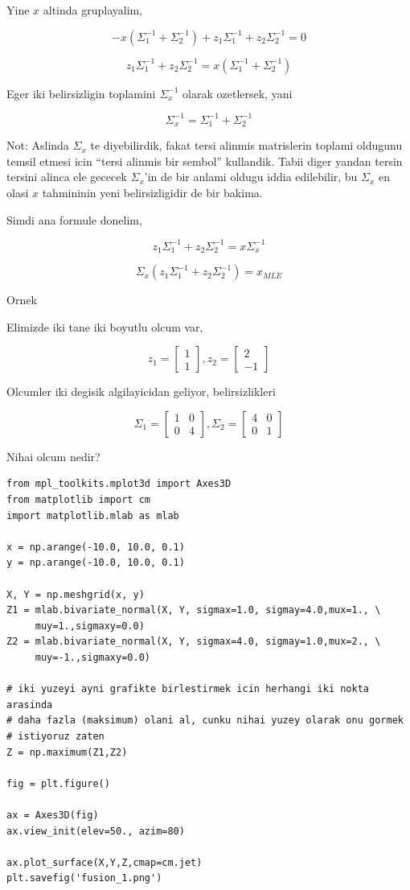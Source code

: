 \documentclass[12pt,fleqn]{article}\usepackage{../common}
\begin{document}
Yine $x$ altinda gruplayalim,

$$ 
-x(\Sigma_1^{-1} + \Sigma_2^{-1}) + z_1\Sigma_1^{-1}  + z_2\Sigma_2^{-1}  = 0
$$

$$ 
z_1\Sigma_1^{-1}  + z_2\Sigma_2^{-1}  = x(\Sigma_1^{-1} + \Sigma_2^{-1}) 
$$

Eger iki belirsizligin toplamini $\Sigma_x^{-1}$ olarak ozetlersek, yani 

$$ 
\Sigma_x^{-1} = \Sigma_1^{-1} + \Sigma_2^{-1}
$$

Not: Aslinda $\Sigma_x$ te diyebilirdik, fakat tersi alinmis matrislerin
toplami oldugunu temsil etmesi icin ``tersi alinmis bir sembol''
kullandik. Tabii diger yandan tersin tersini alinca ele gececek
$\Sigma_x$'in de bir anlami oldugu iddia edilebilir, bu $\Sigma_x$ en olasi
$x$ tahmininin yeni belirsizligidir de bir bakima. 

Simdi ana formule donelim,

$$ 
z_1\Sigma_1^{-1}  + z_2\Sigma_2^{-1}  = x\Sigma_x^{-1}
$$


$$ 
\Sigma_x (z_1\Sigma_1^{-1}  + z_2\Sigma_2^{-1}) = x_{MLE}
$$

Ornek

Elimizde iki tane iki boyutlu olcum var, 

$$ z_1 = \left[\begin{array}{c}
1 \\ 1
\end{array}\right], 
z_2 = \left[\begin{array}{r}
2 \\ -1
\end{array}\right] 
$$

Olcumler iki degisik algilayicidan geliyor, belirsizlikleri

$$ 
\Sigma_1 = 
\left[\begin{array}{cc}
1 & 0 \\ 0 & 4
\end{array}\right], 
\Sigma_2 = 
\left[\begin{array}{cc}
4 & 0 \\ 0 & 1
\end{array}\right]
 $$

Nihai olcum nedir? 

\begin{verbatim}
from mpl_toolkits.mplot3d import Axes3D
from matplotlib import cm
import matplotlib.mlab as mlab

x = np.arange(-10.0, 10.0, 0.1)
y = np.arange(-10.0, 10.0, 0.1)

X, Y = np.meshgrid(x, y)
Z1 = mlab.bivariate_normal(X, Y, sigmax=1.0, sigmay=4.0,mux=1., \
     muy=1.,sigmaxy=0.0)
Z2 = mlab.bivariate_normal(X, Y, sigmax=4.0, sigmay=1.0,mux=2., \
     muy=-1.,sigmaxy=0.0)

# iki yuzeyi ayni grafikte birlestirmek icin herhangi iki nokta arasinda
# daha fazla (maksimum) olani al, cunku nihai yuzey olarak onu gormek 
# istiyoruz zaten
Z = np.maximum(Z1,Z2)

fig = plt.figure()

ax = Axes3D(fig)
ax.view_init(elev=50., azim=80)

ax.plot_surface(X,Y,Z,cmap=cm.jet)
plt.savefig('fusion_1.png')
\end{verbatim}
\end{document}

